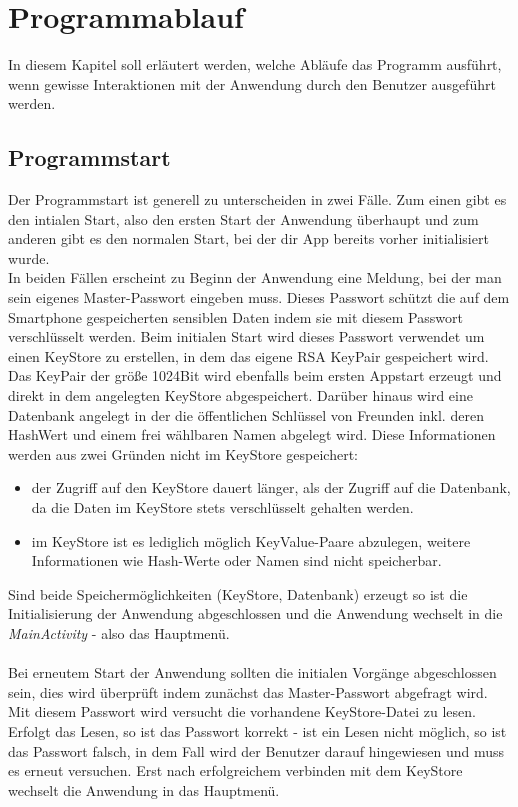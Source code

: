 \documentclass[10pt, a4paper]{scrreprt}
\begin{document}
\section{Programmablauf}
In diesem Kapitel soll erläutert werden, welche Abläufe das Programm ausführt, wenn gewisse Interaktionen mit der Anwendung durch den Benutzer ausgeführt werden. 


\subsection{Programmstart}
Der Programmstart ist generell zu unterscheiden in zwei Fälle. Zum einen gibt es den intialen Start, also den ersten Start der Anwendung überhaupt und  zum anderen gibt es den normalen Start, bei der dir App bereits vorher initialisiert wurde. \\
In beiden Fällen erscheint zu Beginn der Anwendung eine Meldung, bei der man sein eigenes Master-Passwort eingeben muss. Dieses Passwort schützt die auf dem Smartphone gespeicherten sensiblen Daten indem sie mit diesem Passwort verschlüsselt werden. Beim initialen Start wird dieses Passwort verwendet um einen KeyStore zu erstellen, in dem das eigene RSA KeyPair gespeichert wird. Das KeyPair der größe 1024Bit wird ebenfalls beim ersten Appstart erzeugt und direkt in dem angelegten KeyStore abgespeichert. Darüber hinaus wird eine Datenbank angelegt in der die öffentlichen Schlüssel von Freunden inkl. deren HashWert und einem frei wählbaren Namen abgelegt wird. Diese Informationen werden aus zwei Gründen nicht im KeyStore gespeichert:
\begin{itemize}
\item der Zugriff auf den KeyStore dauert länger, als der Zugriff auf die Datenbank, da die Daten im KeyStore stets verschlüsselt gehalten werden.
\item im KeyStore ist es lediglich möglich KeyValue-Paare abzulegen, weitere Informationen wie Hash-Werte oder Namen sind nicht speicherbar.
\end{itemize}
Sind beide Speichermöglichkeiten (KeyStore, Datenbank) erzeugt so ist die Initialisierung der Anwendung abgeschlossen und die Anwendung wechselt in die \textit{MainActivity} - also das Hauptmenü.\\ \\
Bei erneutem Start der Anwendung sollten die initialen Vorgänge abgeschlossen sein, dies wird überprüft indem zunächst das Master-Passwort abgefragt wird. Mit diesem Passwort wird versucht die vorhandene KeyStore-Datei zu lesen. Erfolgt das Lesen, so ist das Passwort korrekt - ist ein Lesen nicht möglich, so ist das Passwort falsch, in dem Fall wird der Benutzer darauf hingewiesen und muss es erneut versuchen. Erst nach erfolgreichem verbinden mit dem KeyStore wechselt die Anwendung in das Hauptmenü.
\end{document}

